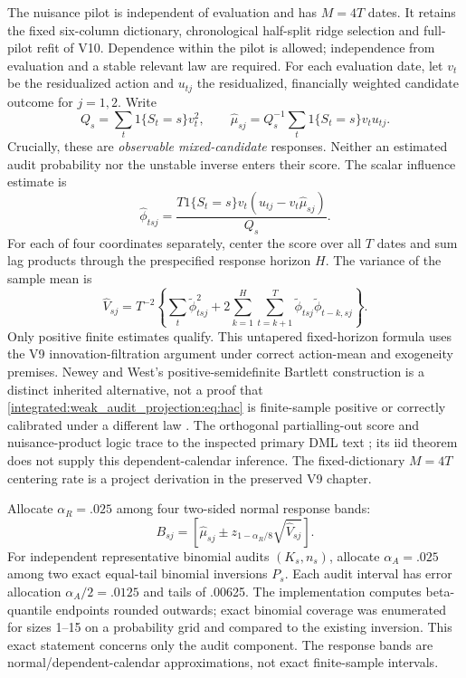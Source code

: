 The nuisance pilot is independent of evaluation and has $M=4T$ dates. It
retains the fixed six-column dictionary, chronological half-split ridge
selection and full-pilot refit of V10. Dependence within the pilot is allowed;
independence from evaluation and a stable relevant law are required. For each
evaluation date, let $v_t$ be the residualized action and $u_{tj}$ the
residualized, financially weighted candidate outcome for $j=1,2$. Write
\begin{equation}
 Q_s=\sum_t1\{S_t=s\}v_t^2,\qquad
 \widehat\mu_{sj}=Q_s^{-1}\sum_t1\{S_t=s\}v_tu_{tj}.
\end{equation}
Crucially, these are \emph{observable mixed-candidate} responses. Neither
an estimated audit probability nor the unstable inverse enters their score.
The scalar influence estimate is
\begin{equation}\label{integrated:weak_audit_projection:eq:score}
 \widehat\phi_{tsj}=\frac{T1\{S_t=s\}v_t
 (u_{tj}-v_t\widehat\mu_{sj})}{Q_s}.
\end{equation}
For each of four coordinates separately, center the score over all $T$ dates
and sum lag products through the prespecified response horizon $H$. The
variance of the sample mean is
\begin{equation}\label{integrated:weak_audit_projection:eq:hac}
 \widehat V_{sj}=T^{-2}\left\{\sum_t\widetilde\phi_{tsj}^2+
 2\sum_{k=1}^{H}\sum_{t=k+1}^{T}
 \widetilde\phi_{tsj}\widetilde\phi_{t-k,sj}\right\}.
\end{equation}
Only positive finite estimates qualify. This untapered fixed-horizon formula
uses the V9 innovation-filtration argument under correct action-mean and
exogeneity premises. Newey and West's positive-semidefinite Bartlett
construction is a distinct inherited alternative, not a proof that
\eqref{integrated:weak_audit_projection:eq:hac} is finite-sample positive or correctly calibrated under a
different law \cite{newey1986}. The orthogonal partialling-out score and
nuisance-product logic trace to the inspected primary DML text
\cite{dml2018}; its iid theorem does not supply this dependent-calendar
inference. The fixed-dictionary $M=4T$ centering rate is a project derivation
in the preserved V9 chapter.

Allocate $\alpha_R=.025$ among four two-sided normal response bands:
\begin{equation}
 B_{sj}=\left[\widehat\mu_{sj}\pm
 z_{1-\alpha_R/8}\sqrt{\widehat V_{sj}}\right].
\end{equation}
For independent representative binomial audits $(K_s,n_s)$, allocate
$\alpha_A=.025$ among two exact equal-tail binomial inversions $P_s$. Each
audit interval has error allocation $\alpha_A/2=.0125$ and tails of .00625.
The implementation computes beta-quantile endpoints rounded outwards; exact
binomial coverage was enumerated for sizes 1--15 on a probability grid and
compared to the existing inversion. This exact statement concerns only the
audit component. The response bands are normal/dependent-calendar
approximations, not exact finite-sample intervals.


